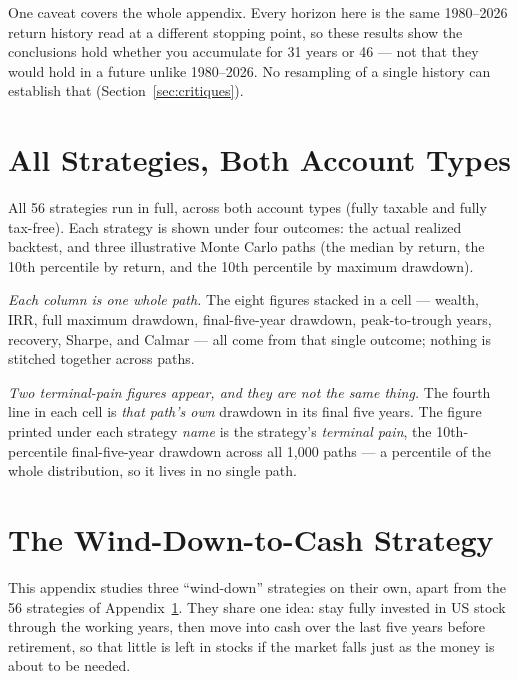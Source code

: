\documentclass[11pt]{article}
\begin{document}
\noindent One caveat covers the whole appendix. Every horizon here is the same 1980--2026 return history
read at a different stopping point, so these results show the conclusions hold whether you accumulate for
31 years or 46 --- not that they would hold in a future unlike 1980--2026. No resampling of a single
history can establish that (Section~\ref{sec:critiques}).

\section{All Strategies, Both Account Types}\label{sec:fullfield}

\noindent All 56 strategies run in full, across both account types (fully taxable and fully tax-free).
Each strategy is shown under four outcomes: the actual realized backtest, and three illustrative Monte
Carlo paths (the median by return, the 10th percentile by return, and the 10th percentile by maximum
drawdown).

\emph{Each column is one whole path.} The eight figures stacked in a cell --- wealth, IRR, full maximum
drawdown, final-five-year drawdown, peak-to-trough years, recovery, Sharpe, and Calmar --- all come from
that single outcome; nothing is stitched together across paths.

\emph{Two terminal-pain figures appear, and they are not the same thing.} The fourth line in each cell
is \emph{that path's own} drawdown in its final five years. The figure printed under each strategy
\emph{name} is the strategy's \emph{terminal pain}, the 10th-percentile final-five-year drawdown across
all 1{,}000 paths --- a percentile of the whole distribution, so it lives in no single path.



\section{The Wind-Down-to-Cash Strategy}\label{sec:winddown}

\noindent This appendix studies three ``wind-down'' strategies on their own, apart from the 56
strategies of Appendix~\ref{sec:fullfield}. They share one idea: stay fully invested in US stock through the working
years, then move into cash over the last five years before retirement, so that little is left in
stocks if the market falls just as the money is about to be needed.
\end{document}
